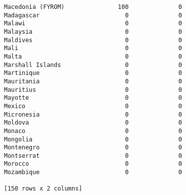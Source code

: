 \documentclass[11pt]{article}
\begin{document}
\begin{Verbatim}[commandchars=\\\{\}]
Macedonia (FYROM)               100              0
Madagascar                        0              0
Malawi                            0              0
Malaysia                          0              0
Maldives                          0              0
Mali                              0              0
Malta                             0              0
Marshall Islands                  0              0
Martinique                        0              0
Mauritania                        0              0
Mauritius                         0              0
Mayotte                           0              0
Mexico                            0              0
Micronesia                        0              0
Moldova                           0              0
Monaco                            0              0
Mongolia                          0              0
Montenegro                        0              0
Montserrat                        0              0
Morocco                           0              0
Mozambique                        0              0

[150 rows x 2 columns]

    \end{Verbatim}


    
    
    
    
\end{document}
